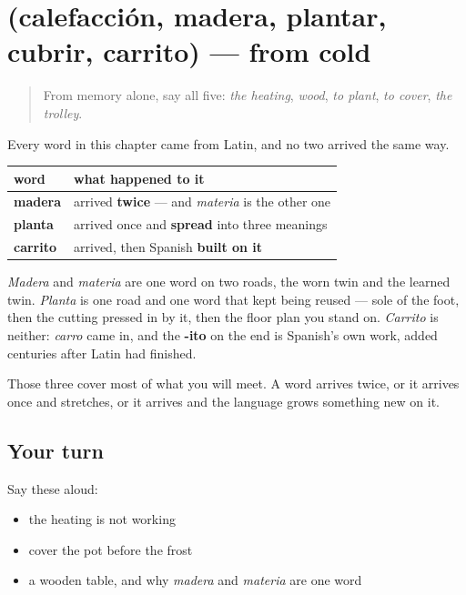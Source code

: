 \section[(calefacción, madera, plantar, cubrir …]{(calefacción, madera, plantar, cubrir, carrito) — from cold}

\label{lesson:ES-R444-repaso-casa}



\begin{quote}
From memory alone, say all five: \emph{the heating}, \emph{wood}, \emph{to plant}, \emph{to cover}, \emph{the trolley}.
\end{quote}

\begin{grammarlens}[title={Grammar Lens: three things a word can do on its way into Spanish}]
Every word in this chapter came from Latin, and no two arrived the same way.

\noindent
\begin{tabularx}{\linewidth}{@{}>{\raggedright\arraybackslash}X>{\raggedright\arraybackslash}X@{}}
\toprule
\textbf{word} & \textbf{what happened to it} \\
\midrule
\textbf{madera} & arrived \textbf{twice} — and \emph{materia} is the other one \\
\textbf{planta} & arrived once and \textbf{spread} into three meanings \\
\textbf{carrito} & arrived, then Spanish \textbf{built on it} \\
\bottomrule
\end{tabularx}

\emph{Madera} and \emph{materia} are one word on two roads, the worn twin and the learned twin. \emph{Planta} is one road and one word that kept being reused — sole of the foot, then the cutting pressed in by it, then the floor plan you stand on. \emph{Carrito} is neither: \emph{carro} came in, and the \textbf{-ito} on the end is Spanish's own work, added centuries after Latin had finished.

Those three cover most of what you will meet. A word arrives twice, or it arrives once and stretches, or it arrives and the language grows something new on it.
\end{grammarlens}

\subsection*{Your turn}
Say these aloud:

\begin{itemize}
\raggedright
  \item the heating is not working
  \item cover the pot before the frost
  \item a wooden table, and why \emph{madera} and \emph{materia} are one word
\end{itemize}

